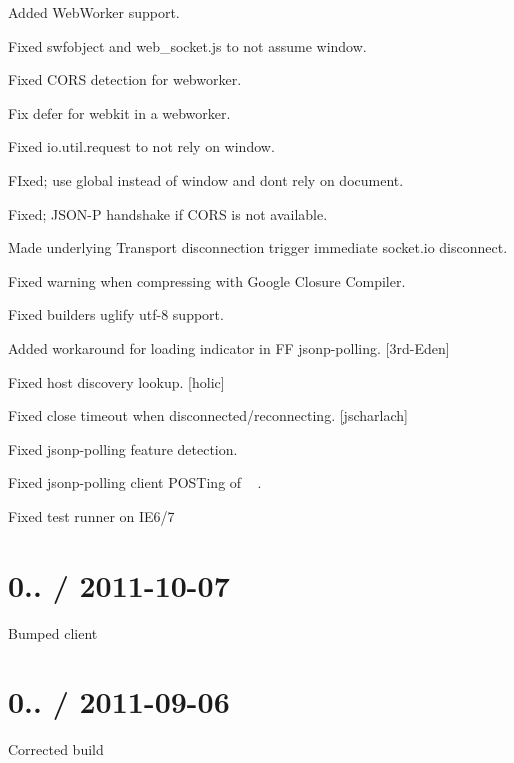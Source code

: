 \begin{DoxyItemize}
\item Added Web\+Worker support.
\item Fixed swfobject and web\+\_\+socket.\+js to not assume window.
\item Fixed C\+O\+RS detection for webworker.
\item Fix {\ttfamily defer} for webkit in a webworker.
\item Fixed io.\+util.\+request to not rely on window.
\item F\+Ixed; use global instead of window and dont rely on document.
\item Fixed; J\+S\+O\+N-\/P handshake if C\+O\+RS is not available.
\item Made underlying Transport disconnection trigger immediate socket.\+io disconnect.
\item Fixed warning when compressing with Google Closure Compiler.
\item Fixed builder\textquotesingle{}s uglify utf-\/8 support.
\item Added workaround for loading indicator in FF jsonp-\/polling. \mbox{[}3rd-\/\+Eden\mbox{]}
\item Fixed host discovery lookup. \mbox{[}holic\mbox{]}
\item Fixed close timeout when disconnected/reconnecting. \mbox{[}jscharlach\mbox{]}
\item Fixed jsonp-\/polling feature detection.
\item Fixed jsonp-\/polling client P\+O\+S\+Ting of ~\newline
.
\item Fixed test runner on I\+E6/7
\end{DoxyItemize}

\section*{0.. / 2011-\/10-\/07 }


\begin{DoxyItemize}
\item Bumped client
\end{DoxyItemize}

\section*{0.. / 2011-\/09-\/06 }


\begin{DoxyItemize}
\item Corrected build
\end{DoxyItemize}

